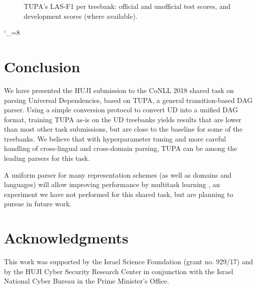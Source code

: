 \documentclass[11pt,a4paper]{article}
\begin{document}
\begin{figure*}[h]
    \caption{TUPA's LAS-F1 per treebank: official and unofficial test scores, and development scores (where available).
    \label{fig:test_per_corpus}}
\end{figure*}
\catcode`\_=8




\section{Conclusion}\label{sec:conclusion}

We have presented the HUJI submission to the CoNLL 2018 shared task on parsing Universal Dependencies, based on TUPA, a general transition-based DAG parser.
Using a simple conversion protocol to convert UD into a unified DAG format,
training TUPA as-is on the UD treebanks yields results that are lower than
most other task submissions, but are close to the baseline for some of the treebanks.
We believe that with hyperparameter tuning and more careful handling of
cross-lingual and cross-domain parsing, TUPA can be among the leading parsers for this task.

A uniform parser for many representation schemes (as well as domains and languages)
will allow improving performance by multitask learning \cite{hershcovich2018multitask},
an experiment we have not performed for this shared task, but are planning to pursue in future work.


\section*{Acknowledgments}

This work was supported by the Israel Science Foundation (grant no. 929/17) and
by the HUJI Cyber Security Research Center
in conjunction with the Israel National Cyber Bureau in the Prime Minister's Office.





\end{document}
